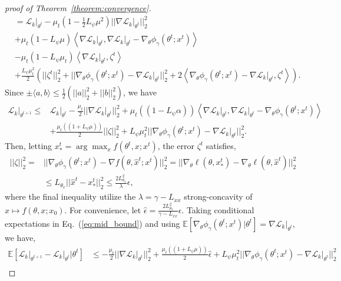 \documentclass{article} %
\theoremstyle{plain}
\theoremstyle{definition}
\theoremstyle{remark}
\begin{document}
\begin{proof}[proof of Theorem~\ref{theorem:convergence}]
\begin{align}
    &=\mathcal{L}_k\big|_{\theta^{t}} -\mu_t\left(1-\frac{1}{2}L_{\psi}\mu^2\right)||\nabla\mathcal{L}_k\big|_{\theta^{t}}||_2^2 \nonumber\\
    &+\mu_t(1-L_{\psi}\mu)\left\langle\nabla\mathcal{L}_k\big|_{\theta^{t}},\nabla\mathcal{L}_k\big|_{\theta^{t}}-\nabla_{\theta}\phi_{\gamma}(\theta^t;x^t) \right\rangle\nonumber\\
    &-\mu_t(1-L_{\psi}\mu_t)\left\langle \nabla\mathcal{L}_k\big|_{\theta^{t}},\zeta^t \right\rangle \nonumber\\
    &+\frac{L_{\psi}\mu_t^2}{2}\left( ||\zeta^t||_2^2+||\nabla_{\theta}\phi_{\gamma}(\theta^t;x^t)-\nabla\mathcal{L}_k\big|_{\theta^{t}}||_2^2+2\left\langle \nabla_{\theta}\phi_{\gamma}(\theta^t;x^t)-\nabla\mathcal{L}_k\big|_{\theta^{t}},\zeta^t \right\rangle \right). \nonumber    
\end{align}
Since $\pm\langle a,b\rangle\leq\frac{1}{2}\left(||a||_2^2+||b||_2^2\right)$, we have
\begin{align}
\label{eq:mid_bound}
    \mathcal{L}_k\big|_{\theta^{t+1}}\leq&\mathcal{L}_k\big|_{\theta^{t}}-\frac{\mu_t}{2}||\nabla\mathcal{L}_k\big|_{\theta^{t}}||_2^2+\mu_t((1-L_{\psi}\alpha))\left\langle\nabla\mathcal{L}_k\big|_{\theta^{t}},\nabla\mathcal{L}_k\big|_{\theta^{t}}-\nabla_{\theta}\phi_{\gamma}(\theta^t;x^t) \right\rangle\\
    & +\frac{\mu_t((1+L_{\psi}\mu))}{2}||\zeta||_2^2+L_{\psi}\mu_t^2||\nabla_{\theta}\phi_{\gamma}(\theta^t;x^t)-\nabla\mathcal{L}_k\big|_{\theta^{t}}||_2^2. \nonumber
\end{align}
Then, letting $x_{*}^t=\arg\max_{x}f(\theta^t,x;x^t)$, the error $\zeta^t$ satisfies,
\begin{align}
    ||\zeta||_2^2=&||\nabla_{\theta}\phi_{\gamma}(\theta^t;x^t)-\nabla f(\theta,\hat{x}^t;x^t)||_2^2=||\nabla_{\theta}\ell(\theta,x_{*}^t)-\nabla_{\theta}\ell(\theta,\hat{x}^t)||_2^2\\
    &\leq L_{\theta_{x}}||\hat{x}^t-x_{*}^t||_2^2\leq \frac{2L_{\theta_{x}}^2}{\lambda}\epsilon,
\end{align}
where the final inequality utilize the $\lambda=\gamma-L_{xx}$ strong-concavity of $x\mapsto f(\theta,x;x_0)$. For convenience, let $\hat{\epsilon}=\frac{2L_{\theta_{x}}^2}{\gamma-L_{xx}}\epsilon$. Taking conditional expectations in Eq.~(\ref{eq:mid_bound}) and using $\mathbb{E}\left[\nabla_{\theta}\phi_{\gamma}(\theta^t;x^t)|\theta^t\right]=\nabla\mathcal{L}_k\big|_{\theta^{t}}$, we have,
\begin{align}
    \mathbb{E}\left[\mathcal{L}_k\big|_{\theta^{t+1}}-\mathcal{L}_k\big|_{\theta^{t}}|\theta^t\right]&\leq -\frac{\mu_t}{2}||\nabla\mathcal{L}_k\big|_{\theta^{t}}||_2^2+\frac{\mu_t((1+L_{\psi}\mu))}{2}\hat{\epsilon}+L_{\psi}\mu_t^2||\nabla_{\theta}\phi_{\gamma}(\theta^t;x^t)-\nabla\mathcal{L}_k\big|_{\theta^{t}}||_2^2\\

\end{align}
\end{proof}
\end{document}
